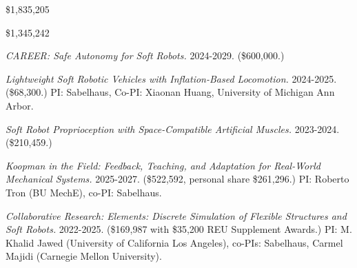 \documentclass[letterpaper]{deedy-resume} %
\begin{document}
{{}} \$1,835,205

{{}} \$1,345,242

\vspace{0.3cm}

{}

\begin{etaremune}[itemsep=0.05cm]

\setcounter{enumi}{6}

\item {{} {\it CAREER: Safe Autonomy for Soft Robots.} 2024-2029.} (\$600,000.)

\item {{} {\it Lightweight Soft Robotic Vehicles with Inflation-Based Locomotion.} 2024-2025.} (\$68,300.) PI: Sabelhaus, Co-PI: Xiaonan Huang, University of Michigan Ann Arbor.

\item {{} {\it Soft Robot Proprioception with Space-Compatible Artificial Muscles.} 2023-2024.} (\$210,459.)

\end{etaremune}

\vspace{0.2cm}

{}

\begin{etaremune}[itemsep=0.05cm]

\item {{} {\it Koopman in the Field: Feedback, Teaching, and Adaptation for Real-World Mechanical Systems.} 2025-2027.} (\$522,592, personal share \$261,296.) PI: Roberto Tron (BU MechE), co-PI: Sabelhaus.

\item {{} {\it Collaborative Research: Elements: Discrete Simulation of Flexible Structures and Soft Robots.} 2022-2025.} (\$169,987 with \$35,200 REU Supplement Awards.) PI: M. Khalid Jawed (University of California Los Angeles), co-PIs: Sabelhaus, Carmel Majidi (Carnegie Mellon University).

\end{etaremune}
\end{document}

